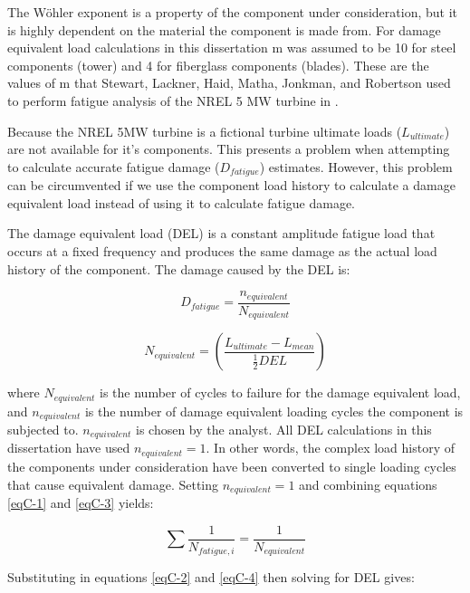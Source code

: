 The W\"{o}hler exponent is a property of the component under consideration, but it is highly dependent on the material the component is made from. For damage equivalent load calculations in this dissertation m was assumed to be 10 for steel components (tower) and 4 for fiberglass components (blades). These are the values of m that Stewart, Lackner, Haid, Matha, Jonkman, and Robertson used to perform fatigue analysis of the NREL 5 MW turbine in \cite{stewart2013}.

Because the NREL 5MW turbine is a fictional turbine ultimate loads ($L_{ultimate}$) are not available for it's components. This presents a problem when attempting to calculate accurate fatigue damage ($D_{fatigue}$) estimates. However, this problem can be circumvented if we use the component load history to calculate a damage equivalent load instead of using it to calculate fatigue damage. 

The damage equivalent load (DEL) is a constant amplitude fatigue load that occurs at a fixed frequency and produces the same damage as the actual load history of the component. The damage caused by the DEL is:

\begin{equation}
D_{fatigue} =  \frac{n_{equivalent}}{N_{equivalent}} \label{eqC-3}
\end{equation}

\begin{equation}
N_{equivalent} = \left ( \frac{L_{ultimate}-L_{mean}}{\frac{1}{2}DEL} \right ) \label{eqC-4}
\end{equation}

where $N_{equivalent}$ is the number of cycles to failure for the damage equivalent load, and $n_{equivalent}$ is the number of damage equivalent loading cycles the component is subjected to. $n_{equivalent}$ is chosen by the analyst. All DEL calculations in this dissertation have used $n_{equivalent} = 1$. In other words, the complex load history of the components under consideration have been converted to single loading cycles that cause equivalent damage. Setting $n_{equivalent} = 1$ and combining equations \ref{eqC-1} and \ref{eqC-3} yields:

\begin{equation}
\sum \frac{1}{N_{fatigue, i}} = \frac{1}{N_{equivalent}} \label{eqC-5}
\end{equation}

Substituting in equations \ref{eqC-2} and \ref{eqC-4} then solving for DEL gives:

